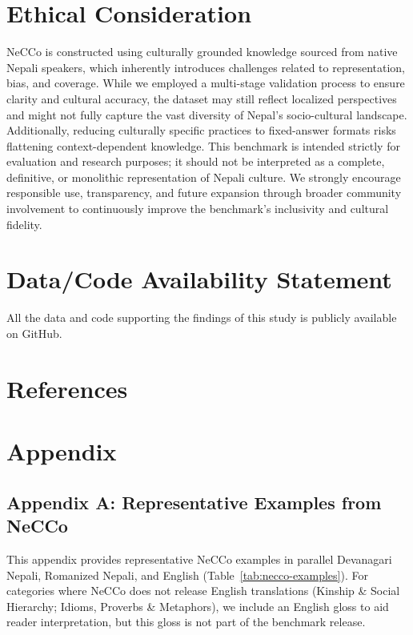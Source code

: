 \documentclass[10pt, a4paper]{article}
\begin{document}
\section{Ethical Consideration}
NeCCo is constructed using culturally grounded knowledge sourced from native Nepali speakers, which inherently introduces challenges related to representation, bias, and coverage. While we employed a multi-stage validation process to ensure clarity and cultural accuracy, the dataset may still reflect localized perspectives and might not fully capture the vast diversity of Nepal's socio-cultural landscape. Additionally, reducing culturally specific practices to fixed-answer formats risks flattening context-dependent knowledge. This benchmark is intended strictly for evaluation and research purposes; it should not be interpreted as a complete, definitive, or monolithic representation of Nepali culture. We strongly encourage responsible use, transparency, and future expansion through broader community involvement to continuously improve the benchmark's inclusivity and cultural fidelity.

\section{Data/Code Availability Statement}
All the data and code supporting the findings of this study is publicly available on GitHub.


\section{References}\label{sec:reference}






\section{Appendix}

\appendix

\subsection*{Appendix A: Representative Examples from NeCCo}
\label{app:examples}
This appendix provides representative NeCCo examples in parallel Devanagari Nepali, Romanized Nepali, and English (Table~\ref{tab:necco-examples}).
For categories where NeCCo does not release English translations (Kinship \& Social Hierarchy; Idioms, Proverbs \& Metaphors),
we include an English gloss to aid reader interpretation, but this gloss is not part of the benchmark release.
\end{document}
